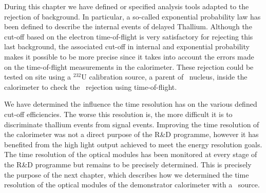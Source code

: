 During this chapter we have defined or specified analysis tools adapted to the rejection of background.
In particular, a so-called exponential probability law has been defined to describe the internal events of delayed Thallium.
Although the cut-off based on the electron time-of-flight is very satisfactory for rejecting this last background, the associated cut-off in internal and exponential probability makes it possible to be more precise since it takes into account the errors made on the time-of-flight measurements in the calorimeter.
These rejection could be tested on site using a $^{232}$U calibration source, a parent of \Tl\ nucleus, inside the calorimeter to check the \Tl\ rejection using time-of-flight.

We have determined the influence the time resolution has on the various defined cut-off efficiencies.
The worse this resolution is, the more difficult it is to discriminate thallium events from signal events.
Improving the time resolution of the calorimeter was not a direct purpose of the R\&D programme, however it has benefited from the high light output achieved to meet the energy resolution goals.
The time resolution of the optical modules has been monitored at every stage of the R\&D programme but remains to be precisely determined.
This is precisely the purpose of the next chapter, which describes how we determined the time resolution of the optical modules of the demonstrator calorimeter with a \Co\ source.
